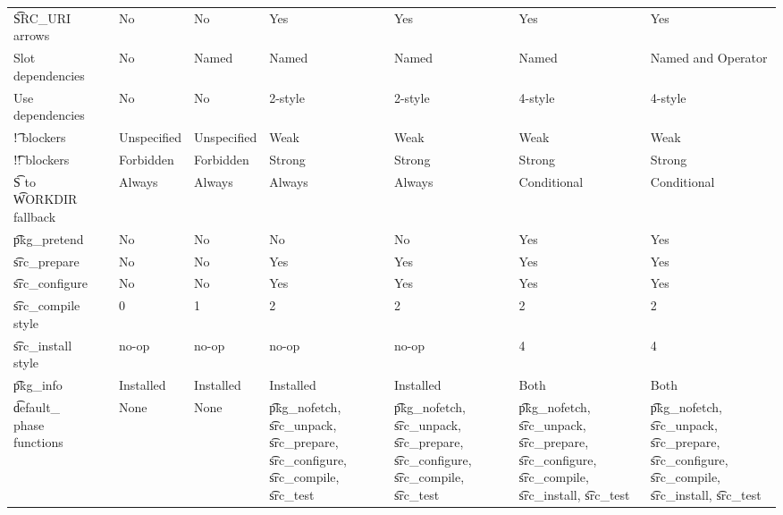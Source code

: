 \begin{landscape}
\begin{longtable}{llP{5em}P{5em}P{6em}P{6em}P{6em}P{6em}}
\t{SRC\_URI} arrows &  &
    No & No & Yes & Yes & Yes & Yes \\

Slot dependencies &  &
    No & Named & Named & Named & Named & Named and Operator \\

Use dependencies &  &
    No & No & 2-style & 2-style & 4-style & 4-style \\

\t{!} blockers &  &
    Unspecified & Unspecified & Weak & Weak & Weak & Weak \\

\t{!!} blockers &  &
    Forbidden & Forbidden & Strong & Strong & Strong & Strong \\

\t{S} to \t{WORKDIR} fallback &  &
    Always & Always & Always & Always & Conditional & Conditional \\

\t{pkg\_pretend} &  &
    No & No & No & No & Yes & Yes \\

\t{src\_prepare} &  &
    No & No & Yes & Yes & Yes & Yes \\

\t{src\_configure} &  &
    No & No & Yes & Yes & Yes & Yes \\

\t{src\_compile} style &  &
    0 & 1 & 2 & 2 & 2 & 2 \\

\t{src\_install} style &  &
    no-op & no-op & no-op & no-op & 4 & 4 \\

\t{pkg\_info} &  &
    Installed & Installed & Installed & Installed & Both & Both \\

\t{default\_} phase functions &  &
    None & None &
    \t{pkg\_nofetch}, \t{src\_unpack}, \t{src\_prepare}, \t{src\_configure}, \t{src\_compile}, \t{src\_test} &
    \t{pkg\_nofetch}, \t{src\_unpack}, \t{src\_prepare}, \t{src\_configure}, \t{src\_compile}, \t{src\_test} &
    \t{pkg\_nofetch}, \t{src\_unpack}, \t{src\_prepare}, \t{src\_configure},
        \t{src\_compile}, \t{src\_install}, \t{src\_test} &
    \t{pkg\_nofetch}, \t{src\_unpack}, \t{src\_prepare}, \t{src\_configure},
        \t{src\_compile}, \t{src\_install}, \t{src\_test} \\


\end{longtable}
\end{landscape}
